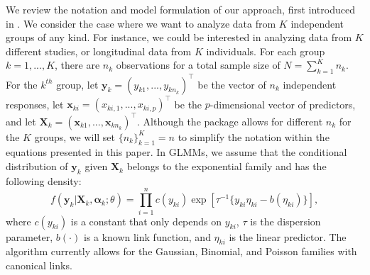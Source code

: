 We review the notation and model formulation of our approach, first introduced in  \cite{rashid2020}. We consider the case where we want to analyze data from \(K\) independent groups of any kind. For instance, we could be interested in analyzing data from \(K\) different studies, or longitudinal data from \(K\) individuals. For each group \(k = 1,...,K\), there are \(n_k\) observations for a total sample size
of \(N = \sum_{k=1}^K n_k\). For the \(k^{th}\) group, let \(\boldsymbol y_k = (y_{k1},...,y_{kn_k})^\top\) be the vector of \(n_k\) independent responses, let
\(\boldsymbol x_{ki} = (x_{ki,1},...,x_{ki,p})^\top\) be the \(p\)-dimensional vector of predictors, and let
\(\boldsymbol X_k = (\boldsymbol x_{k1}, ..., \boldsymbol x_{kn_k})^\top\). Although the  package allows for different \(n_k\) for the
\(K\) groups, we will set \(\{n_k\}_{k=1}^K = n\) to simplify the notation within the equations presented in this paper. In GLMMs, we
assume that the conditional distribution of \(\boldsymbol y_k\) given \(\boldsymbol X_k\) belongs to the exponential family and has the
following density: \begin{equation}
  f(\boldsymbol y_k | \boldsymbol X_k, \boldsymbol \alpha_k; \theta) = 
    \prod_{i=1}^{n} c(y_{ki}) \exp[\tau^{-1} \{y_{ki} \eta_{ki} - b(\eta_{ki})\}],
    \label{eqn:exp_family}
\end{equation} where \(c(y_{ki})\) is a constant that only depends on
\(y_{ki}\), \(\tau\) is the dispersion parameter, \(b(\cdot)\) is a known
link function, and \(\eta_{ki}\) is the linear predictor. The  algorithm currently allows for the Gaussian, Binomial, and
Poisson families with canonical links.


